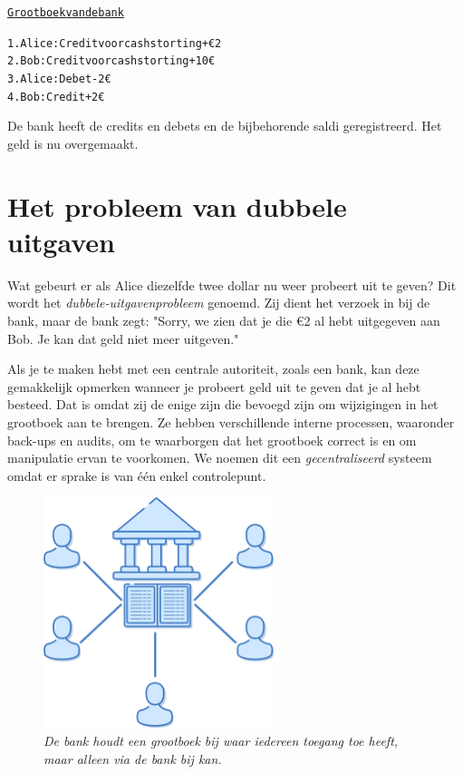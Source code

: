 \begin{alltt}
\underline{Grootboek van de bank}

    1. Alice: Credit voor cash storting +€2
    2. Bob: Credit voor cash storting +10€
    3. Alice: Debet -2€
    4. Bob: Credit +2€
\end{alltt}

De bank heeft de credits en debets en de bijbehorende saldi geregistreerd. Het geld is nu overgemaakt.

\section{Het probleem van dubbele uitgaven}

Wat gebeurt er als Alice diezelfde twee dollar nu weer probeert uit te geven? Dit wordt het \textit{dubbele-uitgavenprobleem} genoemd. Zij dient het verzoek in bij de bank, maar de bank zegt: "Sorry, we zien dat je die €2 al hebt uitgegeven aan Bob. Je kan dat geld niet meer uitgeven."

Als je te maken hebt met een centrale autoriteit, zoals een bank, kan deze gemakkelijk opmerken wanneer je probeert geld uit te geven dat je al hebt besteed. Dat is omdat zij de enige zijn die bevoegd zijn om wijzigingen in het grootboek aan te brengen. Ze hebben verschillende interne processen, waaronder back-ups en audits, om te waarborgen dat het grootboek correct is en om manipulatie ervan te voorkomen. We noemen dit een \textit{gecentraliseerd} systeem omdat er sprake is van één enkel controlepunt.

\begin{figure}[h]
    \centering
    \includegraphics[width=0.6\textwidth]{images/fig2.png}
    \caption{\footnotesize{\textit{De bank houdt een grootboek bij waar iedereen toegang toe heeft, maar alleen via de bank bij kan.}}}
    \label{fig2}
\end{figure}

